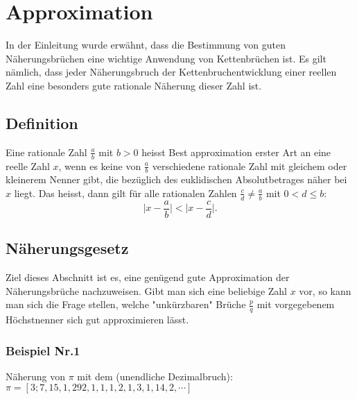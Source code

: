 %
%
%
\section{Approximation
\label{kettenbruch:section:Approximation}}

In der Einleitung wurde erwähnt, dass die Bestimmung von guten
Näherungsbrüchen eine wichtige Anwendung von Kettenbrüchen ist. Es
gilt nämlich, dass jeder Näherungsbruch der Kettenbruchentwicklung
einer reellen Zahl eine besonders gute rationale Näherung dieser
Zahl ist.

\subsection{Definition}

Eine rationale Zahl $\frac{a}{b}$ mit $b>0$ heisst Best approximation
erster Art an eine reelle Zahl $x$, wenn es keine von $\frac{a}{b}$
verschiedene rationale Zahl mit gleichem oder kleinerem Nenner gibt,
die bezüglich des euklidischen Absolutbetrages näher bei $x$ liegt.
Das heisst, dann gilt für alle rationalen Zahlen $\frac{c}{d} \ne
\frac{a}{b}$ mit $0<d\le b$:
\begin{equation}
\biggl|x-\frac{a}{b}\biggr| < \biggl| x-\frac{c}{d}\biggr|.
\end{equation}

\subsection{Näherungsgesetz}
Ziel dieses Abschnitt ist es, eine genügend gute Approximation der
Näherungsbrüche nachzuweisen. Gibt man sich eine beliebige Zahl $x$
vor, so kann man sich die Frage stellen, welche "unkürzbaren" Brüche
$\frac{p}{q}$ mit vorgegebenem Höchstnenner sich gut approximieren
lässt.

\subsubsection{Beispiel Nr.1}
Näherung von $\pi$ mit dem (unendliche Dezimalbruch):
$\pi = [3;7,15,1,292,1,1,1,2,1,3,1,14,2,\cdots]$

